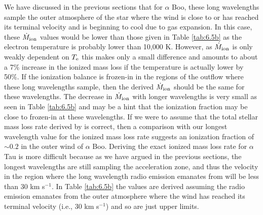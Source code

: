 We have discussed in the previous sections that for $\alpha$ Boo, these long wavelengths sample the outer atmosphere of the star where the wind  is close to or has reached its terminal velocity and is beginning to cool due to gas expansion. In this case, these $\dot{M}_{\rm{ion}}$ values would be lower than those given in Table \ref{tab:6.5b} as the electron temperature is probably lower than 10,000 K. However, as $\dot{M}_{\rm{ion}}$  is only weakly dependent on $T_{\rm{e}}$ this makes only a small difference and amounts to about a 7\% increase in the ionized mass loss if the temperature is actually lower by 50\%. If the ionization balance is frozen-in in the regions of the outflow where these long wavelengths sample, then the derived $\dot{M}_{\rm{ion}}$ should be the same for these wavelengths. The decrease in $\dot{M}_{\rm{ion}}$ with longer wavelengths is very small as seen in Table \ref{tab:6.5b} and may be a hint that the ionization fraction may be close to frozen-in at these wavelengths. If we were to assume that the total stellar mass loss rate derived by \cite{drake_1985} is correct, then a comparison with our longest wavelength value for the ionized mass loss rate suggests an ionization fraction of $\sim 0.2$ in the outer wind of $\alpha$ Boo. Deriving the exact ionized mass loss rate for $\alpha$ Tau is more difficult because as we have argued in the previous sections, the longest wavelengths are still sampling the acceleration zone, and thus the velocity in the region where the long wavelength radio emission emanates from will be less than 30 km s$^{-1}$. In Table \ref{tab:6.5b} the values are derived assuming the radio emission emanates from the outer atmosphere where the wind has reached its terminal velocity (i.e., 30 km s$^{-1}$) and so are just upper limits.